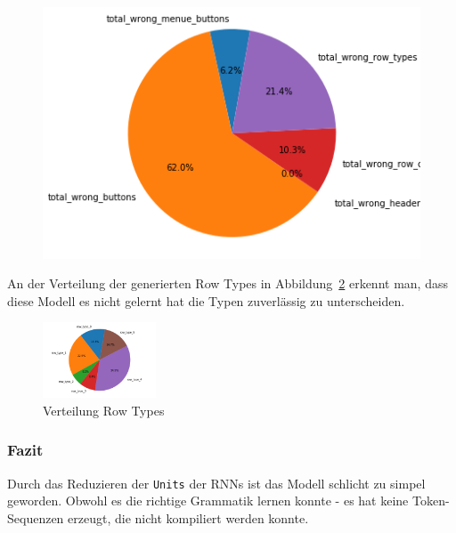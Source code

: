 \documentclass[pdftex,a4paper,halfparskip, article]{scrartcl}
\begin{document}
\begin{figure}
\begin{minipage}{.33\textwidth}
  \label{fig:fehler_beste80_bin16}
\end{minipage}
\begin{minipage}{.33\textwidth}
  \centering
   \includegraphics[width=1\linewidth]{predictions_bin16_p80_error_types_pie_chart}
  \label{fig:fehler_schlechteste20_bin16}
\end{minipage}
\end{figure}

An der Verteilung der generierten Row Types in Abbildung~\ref{fig:bin16_row_type} erkennt man, dass diese Modell es nicht gelernt hat die Typen zuverlässig zu unterscheiden.

\begin{figure}[h]
\centering
\includegraphics[width=0.3\textwidth]{predictions_bin16_predicted_row_type_distribution}
\caption{Verteilung Row Types}
\label{fig:bin16_row_type}
\end{figure}

\subsubsection*{Fazit}
Durch das Reduzieren der \texttt{Units} der RNNs ist das Modell schlicht zu simpel geworden. Obwohl es die richtige Grammatik lernen konnte - es hat keine Token-Sequenzen erzeugt, die nicht kompiliert werden konnte.
\end{document}
